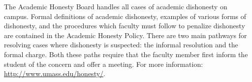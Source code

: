 \documentclass[11pt]{article}
\begin{document}
The Academic Honesty Board handles all cases of academic dishonesty on campus.
Formal definitions of academic dishonesty, examples of various forms of
dishonesty, and the procedures which faculty must follow to penalize dishonesty
are contained in the Academic Honesty Policy. There are two main pathways for
resolving cases where dishonesty is suspected: the informal resolution and the
formal charge. Both these paths require that the faculty member first inform
the student of the concern and offer a meeting. For more information:
\url{http://www.umass.edu/honesty/}.
\end{document}
